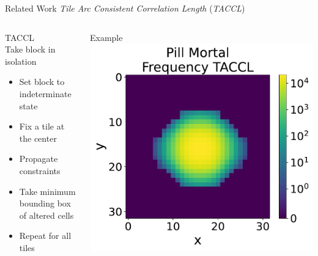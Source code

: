 \documentclass{beamer}
\begin{document}

  \begin{frame}[fragile]{Related Work}
    \textit{Tile Arc Consistent Correlation Length} (\textit{TACCL})
    \begin{columns}[T,onlytextwidth]
        \begin{block}{TACCL}
          \hfill \\
          Take block in isolation
          \begin{itemize}
            \item Set block to indeterminate state
            \item Fix a tile at the center
            \item Propagate constraints
            \item Take minimum bounding box of altered cells
            \item Repeat for all tiles
          \end{itemize}
        \end{block}
        \begin{block}{Example}
          \includegraphics[width=1.125\textwidth]{img/pm_freq_taccl.pdf}
        \end{block}
    \end{columns}
  \end{frame}
\end{document}

